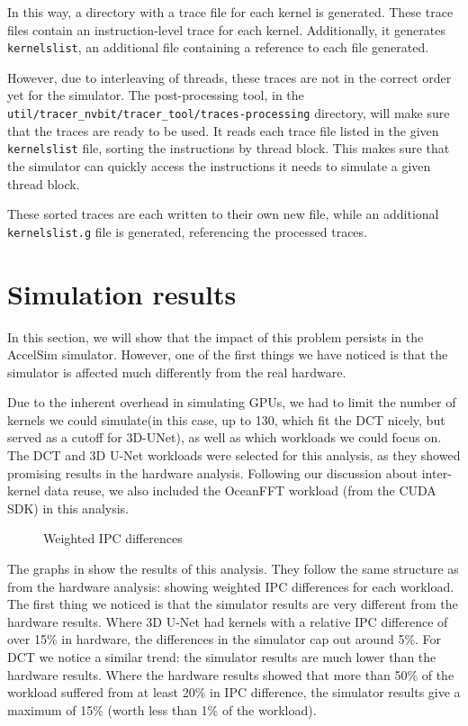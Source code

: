 In this way, a directory with a trace file for each kernel is generated.
These trace files contain an instruction-level trace for each kernel.
Additionally, it generates \verb|kernelslist|, an additional file containing a reference to each file generated.

However, due to interleaving of threads, these traces are not in the correct order yet for the simulator.
The post-processing tool, in the \verb|util/tracer_nvbit/tracer_tool/traces-processing| directory, will make sure that the traces are ready to be used.
It reads each trace file listed in the given \verb|kernelslist| file, sorting the instructions by thread block.
This makes sure that the simulator can quickly access the instructions it needs to simulate a given thread block.

These sorted traces are each written to their own new file, while an additional \verb|kernelslist.g| file is generated, referencing the processed traces.

\FloatBarrier
\section{Simulation results}\label{sec:simulation-results}
In this section, we will show that the impact of this problem persists in the AccelSim simulator.
However, one of the first things we have noticed is that the simulator is affected much differently from the real hardware.

Due to the inherent overhead in simulating GPUs, we had to limit the number of kernels we could simulate(in this case, up to 130, which fit the DCT nicely, but served as a cutoff for 3D-UNet), as well as which workloads we could focus on.
The DCT and 3D U-Net workloads were selected for this analysis, as they showed promising results in the hardware analysis.
Following our discussion about inter-kernel data reuse, we also included the OceanFFT workload (from the CUDA SDK) in this analysis.

\begin{figure}[ht]
    \centering
    \caption{Weighted IPC differences}
    \label{fig:sim_ipc_diff}
\end{figure}

The graphs in  show the results of this analysis.
They follow the same structure as  from the hardware analysis: showing weighted IPC differences for each workload.
The first thing we noticed is that the simulator results are very different from the hardware results.
Where 3D U-Net had kernels with a relative IPC difference of over 15\% in hardware, the differences in the simulator cap out around 5\%.
For DCT we notice a similar trend: the simulator results are much lower than the hardware results.
Where the hardware results showed that more than 50\% of the workload suffered from at least 20\% in IPC difference, the simulator results give a maximum of 15\% (worth less than 1\% of the workload).

